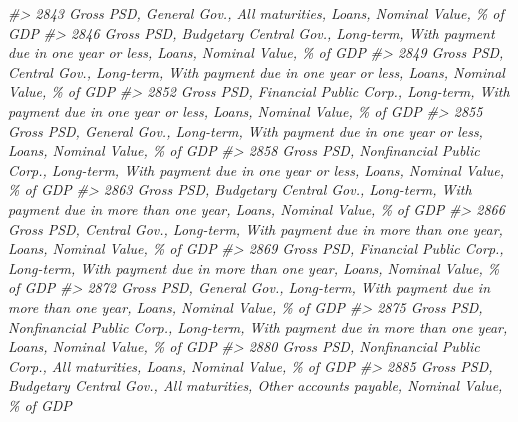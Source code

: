 \documentclass[
]{bxjsbook}
\newenvironment{Shaded}{\begin{snugshade}}{\end{snugshade}}
\newcommand{\CommentTok}[1]{\textcolor[rgb]{0.56,0.35,0.01}{\textit{#1}}}
\theoremstyle{definition}
\theoremstyle{definition}
\theoremstyle{definition}
\theoremstyle{definition}
\theoremstyle{remark}
\begin{document}
\begin{Shaded}
\begin{Highlighting}[]
\CommentTok{\#\textgreater{} 2843                                                                                                    Gross PSD, General Gov., All maturities, Loans, Nominal Value, \% of GDP}
\CommentTok{\#\textgreater{} 2846                                                         Gross PSD, Budgetary Central Gov., Long{-}term, With payment due in one year or less, Loans, Nominal Value, \% of GDP}
\CommentTok{\#\textgreater{} 2849                                                                   Gross PSD, Central Gov., Long{-}term, With payment due in one year or less, Loans, Nominal Value, \% of GDP}
\CommentTok{\#\textgreater{} 2852                                                         Gross PSD, Financial Public Corp., Long{-}term, With payment due in one year or less, Loans, Nominal Value, \% of GDP}
\CommentTok{\#\textgreater{} 2855                                                                   Gross PSD, General Gov., Long{-}term, With payment due in one year or less, Loans, Nominal Value, \% of GDP}
\CommentTok{\#\textgreater{} 2858                                                      Gross PSD, Nonfinancial Public Corp., Long{-}term, With payment due in one year or less, Loans, Nominal Value, \% of GDP}
\CommentTok{\#\textgreater{} 2863                                                       Gross PSD, Budgetary Central Gov., Long{-}term, With payment due in more than one year, Loans, Nominal Value, \% of GDP}
\CommentTok{\#\textgreater{} 2866                                                                 Gross PSD, Central Gov., Long{-}term, With payment due in more than one year, Loans, Nominal Value, \% of GDP}
\CommentTok{\#\textgreater{} 2869                                                       Gross PSD, Financial Public Corp., Long{-}term, With payment due in more than one year, Loans, Nominal Value, \% of GDP}
\CommentTok{\#\textgreater{} 2872                                                                 Gross PSD, General Gov., Long{-}term, With payment due in more than one year, Loans, Nominal Value, \% of GDP}
\CommentTok{\#\textgreater{} 2875                                                    Gross PSD, Nonfinancial Public Corp., Long{-}term, With payment due in more than one year, Loans, Nominal Value, \% of GDP}
\CommentTok{\#\textgreater{} 2880                                                                                       Gross PSD, Nonfinancial Public Corp., All maturities, Loans, Nominal Value, \% of GDP}
\CommentTok{\#\textgreater{} 2885                                                                         Gross PSD, Budgetary Central Gov., All maturities, Other accounts payable, Nominal Value, \% of GDP}

\end{Highlighting}
\end{Shaded}
\end{document}
